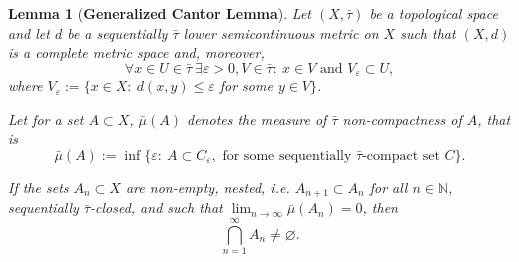 \documentclass[10pt,a4paper]{amsart}
\newtheorem{lem}{Lemma}
\def\ds{\displaystyle}
\begin{document}
\begin{lem}[\textbf{Generalized Cantor Lemma}]
    \label{lem:gen-cantor}
    Let $(X,\bar\tau)$ be a topological space and let $d$ be a sequentially $\bar\tau$ lower semicontinuous metric on $X$ such that $(X,d)$ is a complete metric space and, moreover,
    \begin{equation}
        \label{eq:tops-rshp}
        \forall x\in U \in \bar\tau\ \exists \varepsilon > 0,V\in\bar\tau:\ x\in V\text{ and } V_\varepsilon\subset U,
    \end{equation}
    where $V_\varepsilon := \{x\in X:\ d(x,y)\le\varepsilon$ for some $y\in V\}$.

    Let for a set $A\subset X$, $\bar\mu (A)$ denotes the measure of $\bar \tau$ non-compactness of $A$, that is
    $$
        \bar\mu (A) := \inf\{\varepsilon:\ A \subset C_\varepsilon,\text{ for some sequentially }\bar\tau \text{-compact set } C\}.
    $$

    If the sets $A_n\subset X$ are non-empty, nested, i.e. $A_{n+1}\subset A_n$ for all $n\in\mathbb{N}$, sequentially $\bar\tau$-closed, and such that
    $\ds
        \lim_{n\to\infty} \bar\mu(A_n) = 0$,
        then
    $$
        \bigcap_{n=1}^\infty A_n \neq \varnothing.
    $$
\end{lem}
\end{document}
